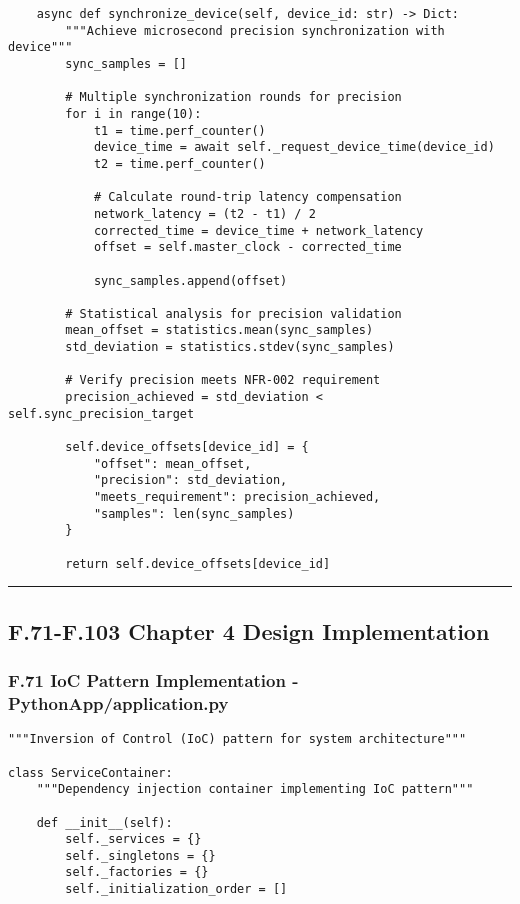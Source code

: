 \documentclass[11pt,a4paper]{article}
\begin{document}
{{\begin{verbatim}
    async def synchronize_device(self, device_id: str) -> Dict:
        """Achieve microsecond precision synchronization with device"""
        sync_samples = []

        # Multiple synchronization rounds for precision
        for i in range(10):
            t1 = time.perf_counter()
            device_time = await self._request_device_time(device_id)
            t2 = time.perf_counter()

            # Calculate round-trip latency compensation
            network_latency = (t2 - t1) / 2
            corrected_time = device_time + network_latency
            offset = self.master_clock - corrected_time

            sync_samples.append(offset)

        # Statistical analysis for precision validation
        mean_offset = statistics.mean(sync_samples)
        std_deviation = statistics.stdev(sync_samples)

        # Verify precision meets NFR-002 requirement
        precision_achieved = std_deviation < self.sync_precision_target

        self.device_offsets[device_id] = {
            "offset": mean_offset,
            "precision": std_deviation,
            "meets_requirement": precision_achieved,
            "samples": len(sync_samples)
        }

        return self.device_offsets[device_id]
\end{verbatim}

\hrule

\subsection{F.71-F.103 Chapter 4 Design Implementation}

\subsubsection{F.71 IoC Pattern Implementation - PythonApp/application.py}

\begin{verbatim}
"""Inversion of Control (IoC) pattern for system architecture"""

class ServiceContainer:
    """Dependency injection container implementing IoC pattern"""

    def __init__(self):
        self._services = {}
        self._singletons = {}
        self._factories = {}
        self._initialization_order = []


\end{verbatim}}}
\end{document}
